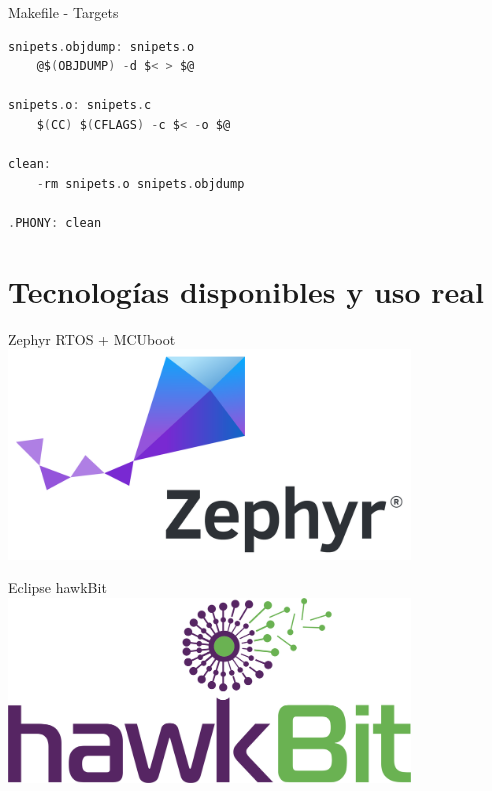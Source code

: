 \documentclass{beamer}
\begin{document}
\begin{frame}[fragile]{Makefile - Targets}
    \begin{lstlisting}[language=C]
snipets.objdump: snipets.o
    @$(OBJDUMP) -d $< > $@

snipets.o: snipets.c
    $(CC) $(CFLAGS) -c $< -o $@

clean:
    -rm snipets.o snipets.objdump

.PHONY: clean
    \end{lstlisting}
\end{frame}

\section{Tecnologías disponibles y uso real}
\begin{frame}
    \sectionpage %
\end{frame}

\begin{frame}{Zephyr RTOS + MCUboot}
    \centering
    \includegraphics[width=0.8\textwidth]{img/zephyr.png}
\end{frame}

\begin{frame}{Eclipse hawkBit}
    \centering
    \includegraphics[width=0.8\textwidth]{img/hawkbit.png}
\end{frame}
\end{document}
